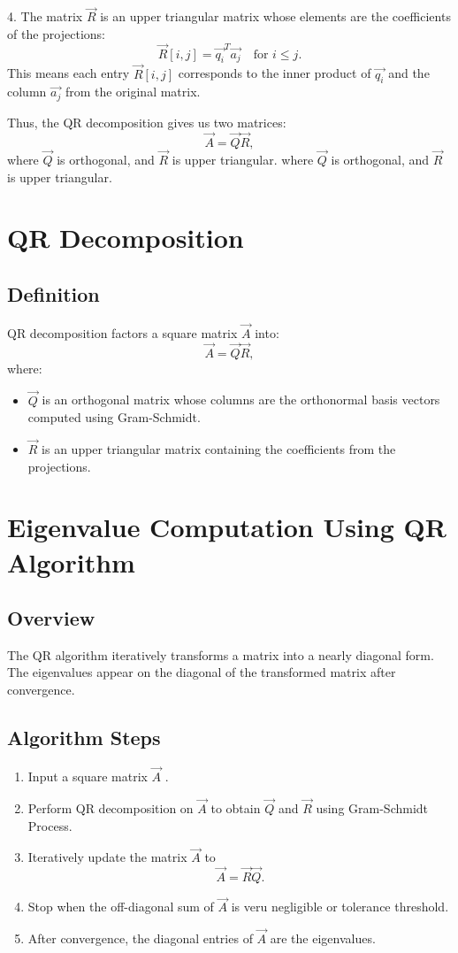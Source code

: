 \documentclass[journal,12pt,onecolumn]{IEEEtran}
\theoremstyle{remark}
\begin{document}
4.  The matrix $\vec{R}$ is an upper triangular matrix whose elements are the coefficients of the projections:  
	$$\vec{R}[i, j] = \vec{q_i}^T \vec{a_j} \quad \text{for } i \leq j.$$
 This means each entry $\vec{R}[i, j] $ corresponds to the inner product of $\vec{q_i}$ and the column $\vec{a_j}$ from the original matrix.

Thus, the QR decomposition gives us two matrices:
$$
\vec{A} = \vec{Q}\vec{R},
$$
where $\vec{Q}$ is orthogonal, and $\vec{R}$ is upper triangular.
where $\vec{Q}$ is orthogonal, and $\vec{R}$ is upper triangular.
\section{QR Decomposition}

\subsection{Definition}
QR decomposition factors a square matrix $\vec{A}$ into:
$$
\vec{A} = \vec{Q}\vec{R},
$$
where:
\begin{itemize}
	\item $\vec{Q}$ is an orthogonal matrix whose columns are the orthonormal basis vectors computed using Gram-Schmidt.
	\item $\vec{R}$ is an upper triangular matrix containing the coefficients from the projections.
\end{itemize}
\section{Eigenvalue Computation Using QR Algorithm}
\subsection{Overview}
The QR algorithm iteratively transforms a matrix into a nearly diagonal form. The eigenvalues appear on the diagonal of the transformed matrix after convergence.

\subsection{Algorithm Steps}
\begin{enumerate}
\item Input a square matrix $\vec{A}$ .
\item Perform QR decomposition on $\vec{A}$ to obtain $\vec{Q}$ and $\vec{R}$ using Gram-Schmidt Process.
\item Iteratively update the matrix $\vec{A}$ to $$\vec{A} = \vec{R}\vec{Q}.$$
\item Stop when the off-diagonal sum of $\vec{A}$ is veru negligible or tolerance threshold.
\item After convergence, the diagonal entries of $\vec{A}$ are the eigenvalues.
\end{enumerate}
\end{document}
